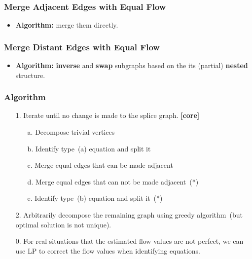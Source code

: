 \frame
{
	\frametitle{Merge Adjacent Edges with Equal Flow}
	\vspace{-2.0cm}

	\begin{itemize}
	\item {\bf Algorithm:} merge them directly.
	\end{itemize}

	\vspace{0.8cm}
	

}

\frame
{
	\frametitle{Merge Distant Edges with Equal Flow}
	\vspace{-3.0cm}

	\begin{itemize}
	\item {\bf Algorithm:} {\bf inverse} and {\bf swap} subgraphs based on the its (partial) {\bf nested} structure.
	\end{itemize}

	\vspace{0.8cm}
	

}

\frame
{
	\frametitle{Algorithm}
	\begin{itemize}
	\item[1.] Iterate until no change is made to the splice graph. {\bf [core]}
		\vspace{0.2cm}
		\begin{itemize}
		\item[a.] Decompose trivial vertices
		\vspace{0.2cm}
		\item[b.] Identify type~(a) equation and split it
		\vspace{0.2cm}
		\item[c.] Merge equal edges that can be made adjacent
		\vspace{0.2cm}
		\item[d.] Merge equal edges that can not be made adjacent~(*)
		\vspace{0.2cm}
		\item[e.] Identify type~(b) equation and split it~(*)
		\vspace{0.2cm}
		\end{itemize}
	\item[2.] Arbitrarily decompose the remaining graph using greedy
		algorithm~(but optimal solution is not unique).

	\vspace{0.2cm}
	\item[0.] For real situations that the estimated flow values are not perfect, 
		we can use LP to correct the flow values when identifying equations.

	\end{itemize}
}

